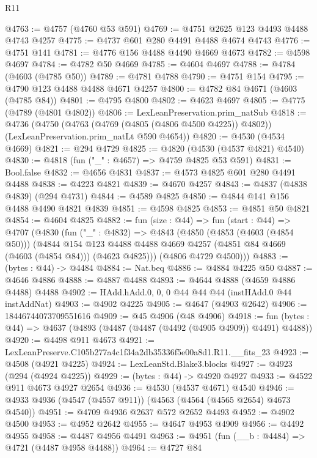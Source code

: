 \begin{lexlean}{R11}
\begin{coremodule}
@4763 := @4757 (@4760 @53 @591)
@4769 := @4751 @2625 @123 @4493 @4488 @4743 @4257
@4775 := @4737 @601 @280 @4491 @4488 @4674 @4743
@4776 := @4751 @141
@4781 := @4776 @156 @4488 @4490 @4669 @4673
@4782 := @4598 @4697
@4784 := @4782 @50 @4669
@4785 := @4604 @4697
@4788 := @4784 (@4603 (@4785 @50))
@4789 := @4781 @4788
@4790 := @4751 @154
@4795 := @4790 @123 @4488 @4488 @4671 @4257
@4800 := @4782 @84 @4671 (@4603 (@4785 @84))
@4801 := @4795 @4800
@4802 := @4623 @4697
@4805 := @4775 (@4789 (@4801 @4802))
@4806 := LexLeanPreservation.prim_natSub
@4818 := @4736
    (@4750
      (@4763 (@4769 (@4805 (@4806 @4500 @4225)) @4802))
      (LexLeanPreservation.prim_natLt @590 @4654))
@4820 := @4530 (@4534 @4669)
@4821 := @294 @4729
@4825 := @4820 (@4530 (@4537 @4821) @4540)
@4830 := @4818 (fun ("_" : @4657) => @4759 @4825 @53 @591)
@4831 := Bool.false
@4832 := @4656 @4831
@4837 := @4573 @4825 @601 @280 @4491 @4488
@4838 := @4223 @4821
@4839 := @4670 @4257
@4843 := @4837 (@4838 @4839) (@294 @4731)
@4844 := @4589 @4825
@4850 := @4844 @141 @156 @4488 @4490 @4821 @4839
@4851 := @4598 @4825
@4853 := @4851 @50 @4821
@4854 := @4604 @4825
@4882 := fun (size : @44) =>
  fun (start : @44) =>
  @4707
    (@4830
      (fun ("_" : @4832) =>
      @4843
        (@4850
          (@4853 (@4603 (@4854 @50)))
          (@4844
            @154
            @123
            @4488
            @4488
            @4669
            @4257
            (@4851 @84 @4669 (@4603 (@4854 @84)))
            (@4623 @4825)))
        (@4806 @4729 @4500)))
@4883 := (bytes : @44) -> @4484
@4884 := Nat.beq
@4886 := @4884 @4225 @50
@4887 := @4646 @4886
@4888 := @4887 @4488
@4893 := @4644 @4888 (@4659 @4886 @4488) @4488
@4902 := HAdd.hAdd.{0, 0, 0} @44 @44 @44 (instHAdd.{0} @44 instAddNat)
@4903 := @4902 @4225
@4905 := @4647 (@4903 @2642)
@4906 := 18446744073709551616
@4909 := @45 @4906 (@48 @4906)
@4918 := fun (bytes : @44) => @4637 (@4893 (@4487 (@4487 (@4492 (@4905 @4909)) @4491) @4488))
@4920 := @4498 @911 @4673
@4921 := LexLeanPreserve.C105b277a4c1f34a2db35336f5e00a8d1.R11.__fits_23
@4923 := @4508 (@4921 @4225)
@4924 := LexLeanStd.Blake3.blocks
@4927 := @4923 (@294 (@4924 @4225))
@4929 := (bytes : @44) -> @4920 @4927
@4933 := @4522 @911 @4673 @4927 @2654
@4936 := @4530 (@4537 @4671) @4540
@4946 := @4933 @4936 (@4547 (@4557 @911)) (@4563 (@4564 (@4565 @2654) @4673 @4540))
@4951 := @4709 @4936 @2637 @572 @2652 @4493
@4952 := @4902 @4500
@4953 := @4952 @2642
@4955 := @4647 @4953 @4909
@4956 := @4492 @4955
@4958 := @4487 @4956 @4491
@4963 := @4951 (fun (__b : @4484) => @4721 (@4487 @4958 @4488))
@4964 := @4727 @84

\end{coremodule}
\end{lexlean}
